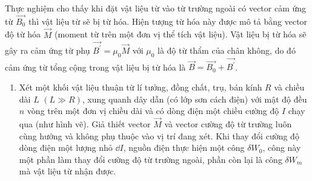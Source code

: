 \begin{vd}
    Thực nghiệm cho thấy khi đặt vật liệu từ vào từ trường ngoài có vector cảm ứng từ $\overrightarrow{{{{B}}_{0}}}$ thì vật liệu từ sẽ bị từ hóa. Hiện tượng từ hóa này được mô tả bằng vector độ từ hóa $\overrightarrow{{M}}$ (moment từ trên một đơn vị thể tích vật liệu). Vật liệu bị từ hóa sẽ gây ra cảm ứng từ phụ $\overrightarrow{{{{B}}^{\prime }}}={{\mu }_{0}}\overrightarrow{{M}}$ với ${{\mu}_{0}}$ là độ từ thẩm của chân không, do đó cảm ứng từ tổng cộng trong vật liệu bị từ hóa là $\overrightarrow{{B}}=\overrightarrow{{{{B}}_{0}}}+\overrightarrow{{{{B}}^{\prime }}}$.
    \begin{enumerate}[1)]
        \item Xét một khối vật liệu thuận từ lí tưởng, đồng chất, trụ, bán kính ${R}$ và chiều dài ${L}$ $({L}\gg {R})$, xung quanh dây dẫn (có lớp sơn cách điện) với mật độ đều $n$ vòng trên một đơn vị chiều dài và có dòng điện một chiều cường độ $I$ chạy qua (như hình vẽ). Giả thiết vector $\overrightarrow{{M}}$ và vector cường độ từ trường luôn cùng hướng và không phụ thuộc vào vị trí đang xét. Khi thay đổi cường độ dòng điện một lượng nhỏ $\dd I$, nguồn điện thực hiện một công $\delta {{{W}}_{0}}$, công này một phần làm thay đổi cường độ từ trường ngoài, phần còn lại là công $\delta {{{W}}_{{m}}}$ mà vật liệu từ nhận được.
        \begin{center}
            


\begin{tikzpicture}[x=0.75pt,y=0.75pt,yscale=-1,xscale=1]


\end{tikzpicture}
\end{center}
\end{enumerate}
\end{vd}
